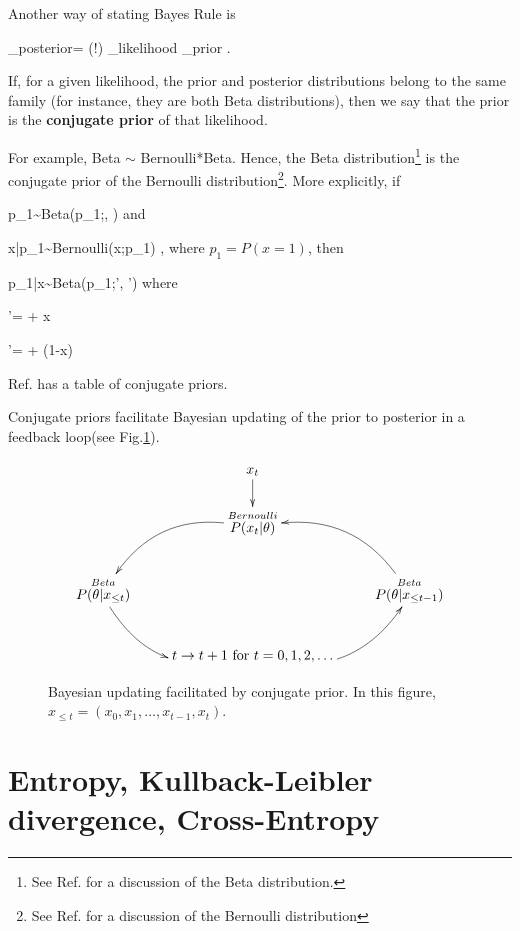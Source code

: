 Another way of stating
Bayes Rule is




\beq
{}_{\rm posterior}=
\caln(!\theta)
_{\rm likelihood}
_{\rm prior}
\;.
\eeq

If, for a given likelihood,
the prior and posterior
distributions belong to
the same family (for instance,
they are both
Beta distributions),
then we say that the prior is the
{\bf conjugate prior}
of that likelihood.

For example,
Beta $\sim$ Bernoulli*Beta.
Hence, the
Beta distribution\footnote{See
Ref.\cite{wiki-beta-dist} for a discussion
of the Beta distribution.}
is the conjugate prior of the
Bernoulli distribution\footnote{See
Ref.\cite{wiki-bern-dist} for a discussion
of the Bernoulli distribution}.
More explicitly,
if

\beq
p_1\sim {\rm Beta}(p_1;\alp, \beta)
\eeq
and

\beq
x|p_1\sim {\rm Bernoulli}(x;p_1)
\;,
\eeq
where $p_1=P(x=1)$,
then

\beq
p_1|x\sim {\rm Beta}(p_1;\alp', \beta')
\eeq
where

\beq
\alp'= \alp + x
\eeq

\beq
\beta'= \beta + (1-x)
\eeq


Ref.\cite{wiki-conj-prior}
has a table of
conjugate priors.

Conjugate priors facilitate
Bayesian updating
of the prior to
posterior in a
feedback loop(see Fig.\ref{fig-conj-prior}).

\begin{figure}[h!]
$$\xymatrix{
&x_t\ar[d]
\\
&\stackrel{Bernoulli}{P(x_t|\theta)}\ar@/_2pc/[ld]
\\
\stackrel{Beta}{P(\theta|x_{\leq t})}\ar@/_2pc/[rd]
&&\stackrel{Beta}{P(\theta|x_{\leq t-1})}\ar@/_2pc/[ul]
\\
&t\rarrow t+1 \text{ for } t=0, 1, 2,\ldots
\ar@/_2pc/[ur]
}$$
\caption{Bayesian updating facilitated
by conjugate prior. In this figure,
$x_{\leq t}=(x_0, x_1, \ldots, x_{t-1}, x_t)$.}
\label{fig-conj-prior}
\end{figure}



\section{Entropy,
 Kullback-Leibler divergence, Cross-Entropy}

